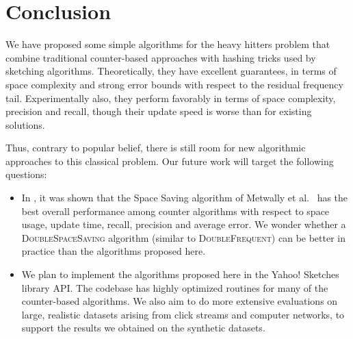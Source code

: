 \documentclass[sigconf,review=true,anonymous=true,screen]{acmart}
\begin{document}
\section{Conclusion}
We have proposed some simple algorithms for the heavy hitters problem that combine traditional
counter-based approaches with hashing tricks used by sketching algorithms. Theoretically, they 
have excellent guarantees, in terms of space complexity and strong error bounds with respect to the
residual frequency tail. Experimentally also, they perform favorably in terms of space complexity, precision
and recall, though their update speed is worse than for existing solutions.

Thus, contrary to popular belief, there is still room for new algorithmic approaches to this classical problem.
Our future work will target the following questions:
\begin{itemize}
\item
In \cite{FrequentSurvey}, it was shown that the Space Saving algorithm of Metwally et al.~\cite{MAA05} has the best overall performance among counter algorithms with respect to space usage, update time, recall, precision and average error. We wonder whether a \textsc{DoubleSpaceSaving} algorithm (similar to \textsc{DoubleFrequent}) can be better in practice than the algorithms proposed here. 

\item
We plan to implement the algorithms proposed here in the Yahoo! Sketches library \cite{yahoolib} API. The codebase has highly optimized routines for many of the counter-based algorithms. We also aim to do more extensive evaluations on large, realistic datasets arising from click streams and computer networks, to support the results we obtained on the synthetic datasets.
\end{itemize}


%



% 
\end{document}
